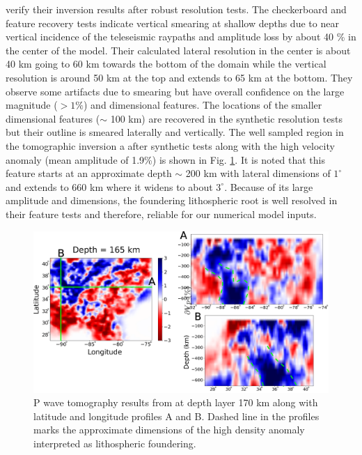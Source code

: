 \documentclass[draft,linenumbers]{agujournal2018}
\begin{document}
    \citet{Biryol_2016} verify their inversion results after robust resolution tests. The checkerboard and feature recovery tests indicate vertical smearing at shallow depths due to near vertical incidence of the teleseismic raypaths and amplitude loss by about 40 \% in the center of the model. Their calculated lateral resolution in the center is about 40 km going to 60 km towards the bottom of the domain while the vertical resolution  is around 50 km at the top and extends to 65 km at the bottom. They observe some artifacts due to smearing but have overall confidence on the large magnitude ($> 1\%$) and dimensional features. The locations of the smaller dimensional features ($\sim$ 100 km) are recovered in the synthetic resolution tests but their outline is smeared laterally and vertically. The well sampled region  in the tomographic inversion a after synthetic tests along with the high velocity anomaly (mean amplitude of 1.9\%) is shown in Fig. \ref{fig_tomo}. It is noted that this feature starts at an approximate depth $\sim$ 200 km with lateral dimensions of $1^\circ$ and extends to 660 km where it widens to about $3^\circ$. Because of its large amplitude and dimensions, the foundering lithospheric root is well resolved in their feature tests and therefore, reliable for our numerical model inputs. 

\begin{figure}[ht]
    \centering
    \includegraphics[width=\linewidth]{figures/figure_tomography.png}
    \caption{P wave tomography results from \citep{Biryol_2016} at depth layer 170 km along with latitude and longitude profiles A and B. Dashed line in the profiles marks the approximate dimensions of the high density anomaly interpreted as lithospheric foundering. }
    \label{fig_tomo}
 \end{figure}
\end{document}

